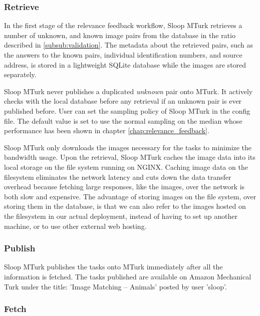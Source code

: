 \subsubsection{Retrieve}

In the first stage of the relevance feedback workflow, Sloop MTurk retrieves a
number of unknown, and known image pairs from the database in the ratio
described in \ref{subsub:validation}. The metadata about the retrieved pairs,
such as the answers to the known pairs, individual identification numbers, and
source address, is stored in a lightweight SQLite database while the images are
stored separately.

Sloop MTurk never publishes a duplicated \emph{unknown} pair onto MTurk. It
actively checks with the local database before any retrieval if an unknown pair
is ever published before. User can set the sampling policy of Sloop MTurk in
the config file. The default value is set to use the normal sampling on the
median whose performance has been shown in chapter
\ref{chap:relevance_feedback}.

Sloop MTurk only downloads the images necessary for the tasks to minimize the
bandwidth usage. Upon the retrieval, Sloop MTurk caches the image data into its
local storage on the file system running on NGINX. Caching image data on the
filesystem eliminates the network latency and cuts down the data transfer
overhead because fetching large responses, like the images, over the network is
both slow and expensive. The advantage of storing images on the file system,
over storing them in the database, is that we can also refer to the images
hosted on the filesystem in our actual deployment, instead of having to set up
another machine, or to use other external web hosting.

\subsubsection{Publish}

Sloop MTurk publishes the tasks onto MTurk immediately after all the
information is fetched. The tasks published are available on Amazon Mechanical
Turk under the title: 'Image Matching -- Animals' posted by user 'sloop'. 

\subsubsection{Fetch}

